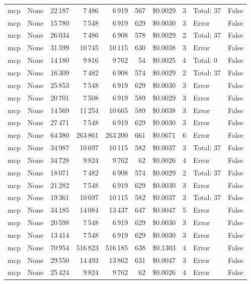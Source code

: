\documentclass[a4paper,11pt]{article}
\begin{document}
\begin{table}[H]
{\begin{tabular}{l r r r r r r r l r}
mcp & None & 22\,187 & 7\,486 & 6\,919 & 567 & \$0.0029 & 3 & Total: 37 & False \\
mcp & None & 15\,780 & 7\,548 & 6\,919 & 629 & \$0.0030 & 3 & Error & False \\
mcp & None & 26\,034 & 7\,486 & 6\,908 & 578 & \$0.0029 & 2 & Total: 37 & False \\
mcp & None & 31\,599 & 10\,745 & 10\,115 & 630 & \$0.0038 & 3 & Error & False \\
mcp & None & 14\,180 & 9\,816 & 9\,762 & 54 & \$0.0025 & 4 & Total: 0 & False \\
mcp & None & 16\,309 & 7\,482 & 6\,908 & 574 & \$0.0029 & 2 & Total: 37 & False \\
mcp & None & 25\,853 & 7\,548 & 6\,919 & 629 & \$0.0030 & 3 & Error & False \\
mcp & None & 20\,701 & 7\,508 & 6\,919 & 589 & \$0.0029 & 3 & Error & False \\
mcp & None & 14\,569 & 11\,254 & 10\,665 & 589 & \$0.0038 & 3 & Error & False \\
mcp & None & 27\,471 & 7\,548 & 6\,919 & 629 & \$0.0030 & 3 & Error & False \\
mcp & None & 64\,380 & 263\,861 & 263\,200 & 661 & \$0.0671 & 6 & Error & False \\
mcp & None & 34\,987 & 10\,697 & 10\,115 & 582 & \$0.0037 & 3 & Total: 37 & False \\
mcp & None & 34\,728 & 9\,824 & 9\,762 & 62 & \$0.0026 & 4 & Error & False \\
mcp & None & 18\,071 & 7\,482 & 6\,908 & 574 & \$0.0029 & 2 & Total: 37 & False \\
mcp & None & 21\,282 & 7\,548 & 6\,919 & 629 & \$0.0030 & 3 & Error & False \\
mcp & None & 19\,361 & 10\,697 & 10\,115 & 582 & \$0.0037 & 3 & Total: 37 & False \\
mcp & None & 34\,185 & 14\,084 & 13\,437 & 647 & \$0.0047 & 5 & Error & False \\
mcp & None & 20\,598 & 7\,548 & 6\,919 & 629 & \$0.0030 & 3 & Error & False \\
mcp & None & 13\,414 & 7\,548 & 6\,919 & 629 & \$0.0030 & 3 & Error & False \\
mcp & None & 70\,954 & 516\,823 & 516\,185 & 638 & \$0.1303 & 4 & Error & False \\
mcp & None & 29\,550 & 14\,493 & 13\,862 & 631 & \$0.0047 & 3 & Error & False \\
mcp & None & 25\,424 & 9\,824 & 9\,762 & 62 & \$0.0026 & 4 & Error & False \\

\end{tabular}}
\end{table}
\end{document}
